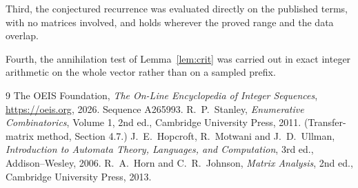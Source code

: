\documentclass[11pt,a4paper]{article}
\theoremstyle{plain}
\theoremstyle{definition}
\begin{document}
Third, the conjectured recurrence was evaluated directly on the published terms, with no
matrices involved, and holds wherever the proved range and the data overlap.

Fourth, the annihilation test of Lemma~\ref{lem:crit} was carried out in exact integer
arithmetic on the whole vector rather than on a sampled prefix.

\begin{thebibliography}{9}
 The OEIS Foundation, \emph{The On-Line Encyclopedia of Integer
Sequences}, \url{https://oeis.org}, 2026. Sequence A265993.
 R.~P.~Stanley, \emph{Enumerative Combinatorics}, Volume 1, 2nd ed.,
Cambridge University Press, 2011. (Transfer-matrix method, Section 4.7.)
 J.~E.~Hopcroft, R.~Motwani and J.~D.~Ullman, \emph{Introduction to Automata
Theory, Languages, and Computation}, 3rd ed., Addison--Wesley, 2006.
 R.~A.~Horn and C.~R.~Johnson, \emph{Matrix Analysis}, 2nd ed., Cambridge
University Press, 2013.
\end{thebibliography}
\end{document}
